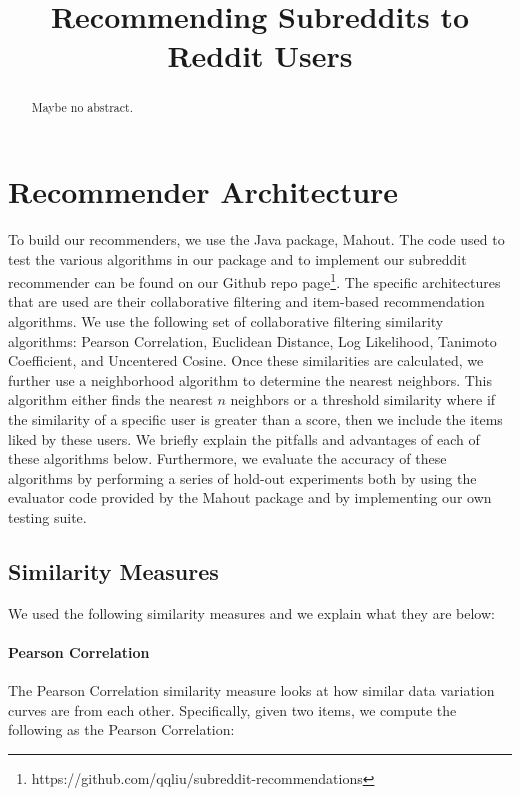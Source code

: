 \documentclass{article}
\title{Recommending Subreddits to Reddit Users}
\author{
}
\begin{document}

\maketitle

\begin{abstract}
Maybe no abstract.
\end{abstract}

\section{Recommender Architecture}\label{sec:rec-arch}

To build our recommenders, we use the Java package, Mahout. The code
used to test the various algorithms in our package and to implement
our subreddit recommender can be found on our Github repo page\footnote{https://github.com/qqliu/subreddit-recommendations}. The specific 
architectures that are used are their collaborative filtering and item-based recommendation algorithms. 
We use the following set of collaborative filtering similarity algorithms: 
Pearson Correlation, Euclidean Distance, Log Likelihood, Tanimoto Coefficient, and Uncentered Cosine. 
Once these similarities are calculated, we further use a neighborhood algorithm to 
determine the nearest neighbors. This algorithm either finds the nearest
$n$ neighbors or a threshold similarity where if the similarity of a specific user is
greater than a score, then we include the items liked by these
users. We briefly explain
the pitfalls and advantages of each of these algorithms below. Furthermore, we evaluate the 
accuracy of these algorithms by performing a series of hold-out experiments both by using the 
evaluator code provided by the Mahout package and by implementing our own testing suite.

\subsection{Similarity Measures}

We used the following similarity measures and we explain what they are below:

\paragraph{Pearson Correlation}

The Pearson Correlation similarity measure looks at how similar data variation curves are from each other. 
Specifically, given two items, we compute the following as the Pearson Correlation: 
\end{document}
